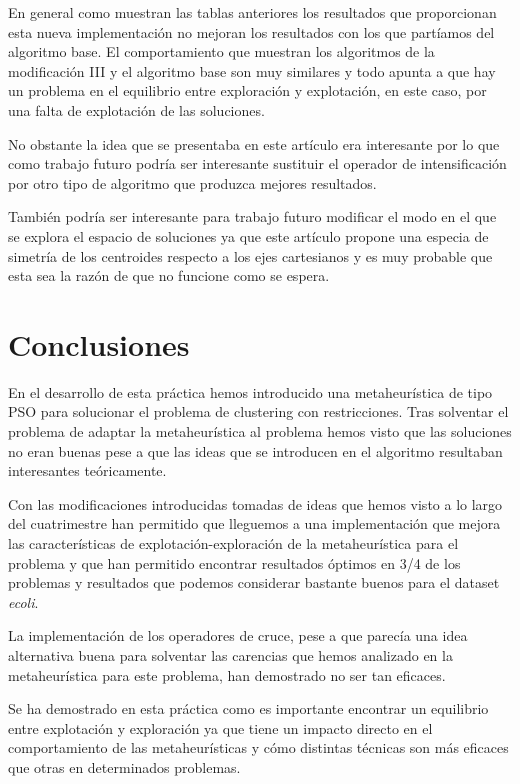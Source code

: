 \documentclass[11pt]{article}
\begin{document}
En general como muestran las tablas anteriores los resultados que proporcionan
esta nueva implementación no mejoran los resultados con los que partíamos del
algoritmo base. El comportamiento que muestran los algoritmos de la modificación
III y el algoritmo base son muy similares y todo apunta a que hay un problema en
el equilibrio entre exploración y explotación, en este caso, por una falta de
explotación de las soluciones. 

No obstante la idea que se presentaba en este artículo era interesante por lo que
como trabajo futuro podría ser interesante sustituir el operador de
intensificación por otro tipo de algoritmo que produzca mejores resultados. 

También podría ser interesante para trabajo futuro modificar el modo en el que
se explora el espacio de soluciones ya que este artículo propone una especia de
simetría de los centroides respecto a los ejes cartesianos y es muy probable que 
esta sea la razón de que no funcione como se espera.

\section{Conclusiones}

En el desarrollo de esta práctica hemos introducido una metaheurística de tipo
PSO para solucionar el problema de clustering con restricciones. Tras solventar
el problema de adaptar la metaheurística al problema hemos visto que las
soluciones no eran buenas pese a que las ideas que se introducen en el algoritmo
resultaban interesantes teóricamente. 

Con las modificaciones introducidas tomadas de ideas que hemos visto a lo largo
del cuatrimestre han permitido que lleguemos a una implementación que mejora las
características de explotación-exploración de la metaheurística para el problema
y que han permitido encontrar resultados óptimos en 3/4 de los problemas y
resultados que podemos considerar bastante buenos para el dataset
\textit{ecoli}.

La implementación de los operadores de cruce, pese a que parecía una idea
alternativa buena para solventar las carencias que hemos analizado en la
metaheurística para este problema, han demostrado no ser tan eficaces.

Se ha demostrado en esta práctica como es importante encontrar un equilibrio
entre explotación y exploración ya que tiene un impacto directo en el
comportamiento de las metaheurísticas y cómo distintas técnicas son más eficaces
que otras en determinados problemas.
\end{document}
